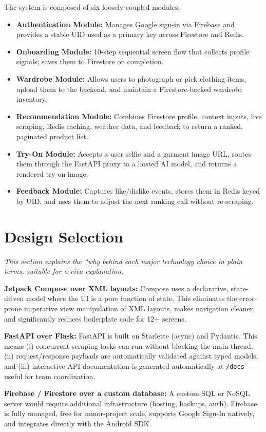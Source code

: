 \documentclass[12pt,a4paper]{report}
\begin{document}
The system is composed of six loosely-coupled modules:
\begin{itemize}
  \item \textbf{Authentication Module:} Manages Google sign-in via Firebase and provides a stable UID used as a primary key across Firestore and Redis.
  \item \textbf{Onboarding Module:} 10-step sequential screen flow that collects profile signals; saves them to Firestore on completion.
  \item \textbf{Wardrobe Module:} Allows users to photograph or pick clothing items, upload them to the backend, and maintain a Firestore-backed wardrobe inventory.
  \item \textbf{Recommendation Module:} Combines Firestore profile, context inputs, live scraping, Redis caching, weather data, and feedback to return a ranked, paginated product list.
  \item \textbf{Try-On Module:} Accepts a user selfie and a garment image URL, routes them through the FastAPI proxy to a hosted AI model, and returns a rendered try-on image.
  \item \textbf{Feedback Module:} Captures like/dislike events, stores them in Redis keyed by UID, and uses them to adjust the next ranking call without re-scraping.
\end{itemize}

\section{Design Selection}

\textit{This section explains the ``why behind each major technology choice in plain terms, suitable for a viva explanation.}

\textbf{Jetpack Compose over XML layouts:} Compose uses a declarative, state-driven model where the UI is a pure function of state. This eliminates the error-prone imperative view manipulation of XML layouts, makes navigation cleaner, and significantly reduces boilerplate code for 12+ screens.

\textbf{FastAPI over Flask:} FastAPI is built on Starlette (async) and Pydantic. This means (i) concurrent scraping tasks can run without blocking the main thread, (ii) request/response payloads are automatically validated against typed models, and (iii) interactive API documentation is generated automatically at \texttt{/docs} --- useful for team coordination.

\textbf{Firebase / Firestore over a custom database:} A custom SQL or NoSQL server would require additional infrastructure (hosting, backups, auth). Firebase is fully managed, free for minor-project scale, supports Google Sign-In natively, and integrates directly with the Android SDK.
\end{document}
